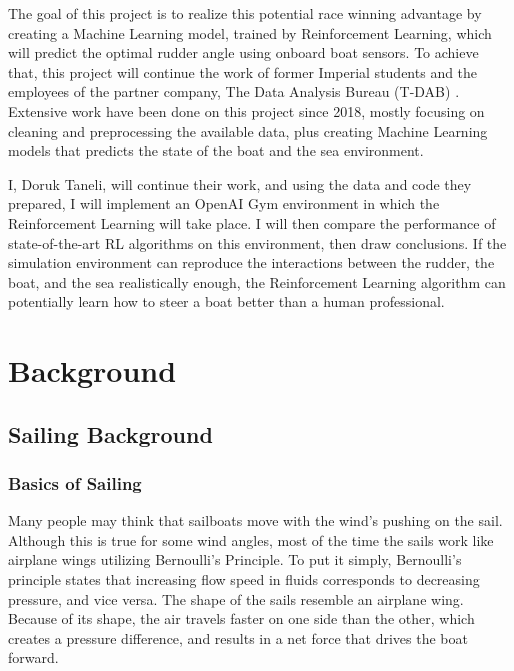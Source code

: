 \documentclass[12pt,twoside]{report}
\begin{document}
The goal of this project is to realize this potential race winning advantage by creating a Machine Learning model, trained by Reinforcement Learning, which will predict the optimal rudder angle using onboard boat sensors. To achieve that, this project will continue the work of former Imperial students and the employees of the partner company, The Data Analysis Bureau (T-DAB) \cite{t-dab}. Extensive work have been done on this project since 2018, mostly focusing on cleaning and preprocessing the available data, plus creating Machine Learning models that predicts the state of the boat and the sea environment.

I, Doruk Taneli, will continue their work, and using the data and code they prepared, I will implement an OpenAI Gym environment in which the Reinforcement Learning will take place. I will then compare the performance of state-of-the-art RL algorithms on this environment, then draw conclusions. If the simulation environment can reproduce the interactions between the rudder, the boat, and the sea realistically enough, the Reinforcement Learning algorithm can potentially learn how to steer a boat better than a human professional.




\chapter{Background}

\section{Sailing Background}

\subsection{Basics of Sailing}
Many people may think that sailboats move with the wind's pushing on the sail. Although this is true for some wind angles, most of the time the sails work like airplane wings utilizing Bernoulli's Principle. To put it simply, Bernoulli's principle states that increasing flow speed in fluids corresponds to decreasing pressure, and vice versa. The shape of the sails resemble an airplane wing. Because of its shape, the air travels faster on one side than the other, which creates a pressure difference, and results in a net force that drives the boat forward.
\end{document}
